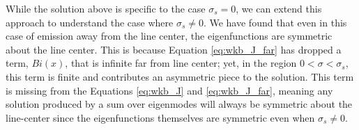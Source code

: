 \documentclass[linenumbers]{aastex63}
\begin{document}


%


While the solution above is specific to the case $\sigma_s = 0$, we can extend this approach to understand the case where $\sigma_s \neq 0$. We have found that even in this case of emission away from the line center, the eigenfunctions are symmetric about the line center. This is because Equation \ref{eq:wkb_J_far} has dropped a term, $Bi(x)$, that is infinite far from line center; yet, in the region $0 < \sigma < \sigma_s$, this term is finite and contributes an asymmetric piece to the solution. This term is missing from the Equations \ref{eq:wkb_J} and \ref{eq:wkb_J_far}, meaning any solution produced by a sum over eigenmodes will always be symmetric about the line-center since the eigenfunctions themselves are symmetric even when $\sigma_s \neq 0$. 




{}

\end{document}
